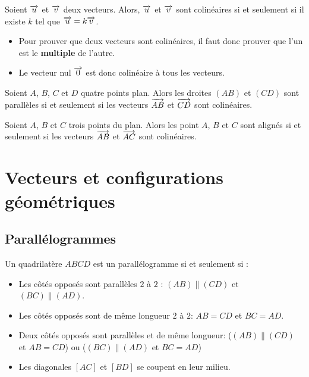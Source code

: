 \documentclass{poly}
\begin{document}
\begin{proposition}
Soient $\overrightarrow{u}$ et $\overrightarrow{v}$ deux vecteurs. Alors, $\overrightarrow{u}$ et $\overrightarrow{v}$ sont colinéaires si et seulement si il existe $k$ tel que $\overrightarrow{u} = k \overrightarrow{v}$. 
\end{proposition}

\begin{remark}
\hfill
\begin{itemize}
\item Pour prouver que deux vecteurs sont colinéaires, il faut donc prouver que l'un est le \textbf{multiple} de l'autre.
\item Le vecteur nul $\overrightarrow{0}$ est donc colinéaire à tous les vecteurs.
\end{itemize}
\end{remark}

\begin{proposition}
Soient $A$, $B$, $C$ et $D$ quatre points plan. Alors les droites $(AB)$ et $(CD)$ sont parallèles si et seulement si les vecteurs $\overrightarrow{AB}$ et $\overrightarrow{CD}$ sont colinéaires. 
\end{proposition}

\begin{proposition}
Soient $A$, $B$ et $C$ trois points du plan. Alors les point $A$, $B$ et $C$ sont alignés si et seulement si les vecteurs $\overrightarrow{AB}$ et $\overrightarrow{AC}$ sont colinéaires.
\end{proposition}


\newpage

\section{Vecteurs et configurations géométriques}

\subsection{Parallélogrammes}

\begin{definition}[Rappels]
Un quadrilatère $ABCD$ est un parallélogramme si et seulement si :
\begin{itemize}
\item Les côtés opposés sont parallèles $2$ à $2$ : $(AB) \parallel (CD)$ et $(BC) \parallel (AD)$.
\item Les côtés opposés sont de même longueur $2$ à $2$: $AB = CD$ et $BC = AD$.
\item Deux côtés opposés sont parallèles et de même longueur: ($(AB) \parallel (CD)$ et $AB = CD$) ou ($(BC) \parallel (AD)$ et $BC = AD$)
\item Les diagonales $[AC]$ et $[BD]$ se coupent en leur milieu.
\end{itemize} 
\end{definition}
\end{document}
